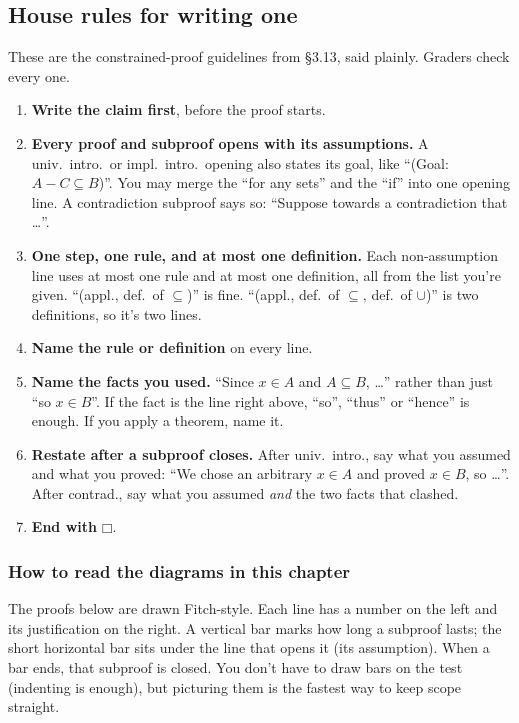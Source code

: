 \subsection{House rules for writing one}

These are the constrained-proof guidelines from \S3.13, said plainly. Graders check every one.

\begin{enumerate}
  \item \textbf{Write the claim first}, before the proof starts.
  \item \textbf{Every proof and subproof opens with its assumptions.} A univ.\ intro.\ or impl.\ intro.\ opening also states its goal, like ``(Goal: $A-C\subseteq B$)''. You may merge the ``for any sets'' and the ``if'' into one opening line. A contradiction subproof says so: ``Suppose towards a contradiction that \dots''.
  \item \textbf{One step, one rule, and at most one definition.} Each non-assumption line uses at most one rule and at most one definition, all from the list you're given. ``(appl., def.\ of $\subseteq$)'' is fine. ``(appl., def.\ of $\subseteq$, def.\ of $\cup$)'' is two definitions, so it's two lines.
  \item \textbf{Name the rule or definition} on every line.
  \item \textbf{Name the facts you used.} ``Since $x\in A$ and $A\subseteq B$, \dots'' rather than just ``so $x\in B$''. If the fact is the line right above, ``so'', ``thus'' or ``hence'' is enough. If you apply a theorem, name it.
  \item \textbf{Restate after a subproof closes.} After univ.\ intro., say what you assumed and what you proved: ``We chose an arbitrary $x\in A$ and proved $x\in B$, so \dots''. After contrad., say what you assumed \emph{and} the two facts that clashed.
  \item \textbf{End with} $\mdlgwhtsquare$.
\end{enumerate}

\subsubsection{How to read the diagrams in this chapter}

The proofs below are drawn Fitch-style. Each line has a number on the left and its justification on the right. A vertical bar marks how long a subproof lasts; the short horizontal bar sits under the line that opens it (its assumption). When a bar ends, that subproof is closed. You don't have to draw bars on the test (indenting is enough), but picturing them is the fastest way to keep scope straight.

